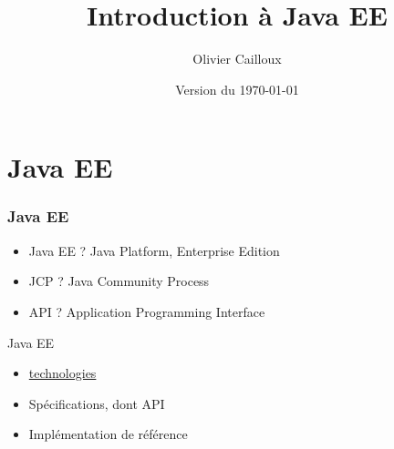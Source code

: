 \documentclass[english, french]{beamer}
\title{Introduction à Java EE}
\author{Olivier Cailloux}
\institute[LAMSADE]{LAMSADE, Université Paris-Dauphine}
\date{Version du \today}
\begin{document}


\begin{frame}[plain]
   \titlepage
\end{frame}
\addtocounter{framenumber}{-1}

\section{Java EE}
\begin{frame}
	\frametitle{Java EE}
	\begin{itemize}
		\item Java EE ? \pause Java Platform, Enterprise Edition \pause
		\item JCP ? \pause Java Community Process \pause
		\item API ? \pause Application Programming Interface \pause
	\end{itemize}
	\begin{block}{Java EE}
		\begin{itemize}
			\item \href{https://www.oracle.com/java/technologies/java-ee-glance.html\#javaee8}{technologies}
			\item Spécifications, dont API
			\item Implémentation de référence
		\end{itemize}
	\end{block}
\end{frame}
\end{document}
